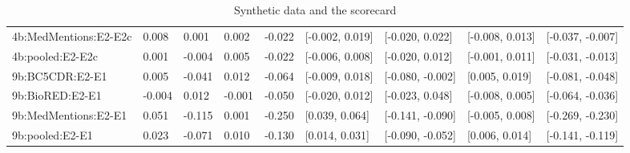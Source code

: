 \begin{table}[t]
\begin{tabular}{lllllllll}
4b:MedMentions:E2-E2c & 0.008 & 0.001 & 0.002 & -0.022 & [-0.002, 0.019] & [-0.020, 0.022] & [-0.008, 0.013] & [-0.037, -0.007] \\
4b:pooled:E2-E2c & 0.001 & -0.004 & 0.005 & -0.022 & [-0.006, 0.008] & [-0.020, 0.012] & [-0.001, 0.011] & [-0.031, -0.013] \\
9b:BC5CDR:E2-E1 & 0.005 & -0.041 & 0.012 & -0.064 & [-0.009, 0.018] & [-0.080, -0.002] & [0.005, 0.019] & [-0.081, -0.048] \\
9b:BioRED:E2-E1 & -0.004 & 0.012 & -0.001 & -0.050 & [-0.020, 0.012] & [-0.023, 0.048] & [-0.008, 0.005] & [-0.064, -0.036] \\
9b:MedMentions:E2-E1 & 0.051 & -0.115 & 0.001 & -0.250 & [0.039, 0.064] & [-0.141, -0.090] & [-0.005, 0.008] & [-0.269, -0.230] \\
9b:pooled:E2-E1 & 0.023 & -0.071 & 0.010 & -0.130 & [0.014, 0.031] & [-0.090, -0.052] & [0.006, 0.014] & [-0.141, -0.119] \\
\hline
\end{tabular}
\caption{Synthetic data and the scorecard}
\label{tab:rq5_synthetic_scorecard}
\end{table}
